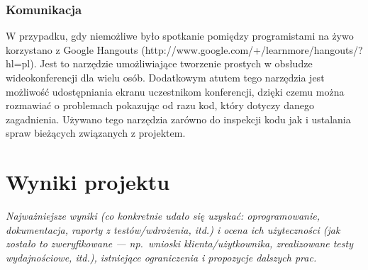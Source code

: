 \documentclass[polish,12pt]{aghthesis}
\begin{document}
\subsubsection{Komunikacja}

W przypadku, gdy niemożliwe było spotkanie pomiędzy programistami na żywo korzystano z Google Hangouts (http://www.google.com/+/learnmore/hangouts/?hl=pl). Jest to narzędzie umożliwiające tworzenie prostych w obsłudze wideokonferencji dla wielu osób. Dodatkowym atutem tego narzędzia jest możliwość udostępniania ekranu uczestnikom konferencji, dzięki czemu można rozmawiać o problemach pokazując od razu kod, który dotyczy danego zagadnienia. Używano tego narzędzia zarówno do inspekcji kodu jak i ustalania spraw bieżących związanych z projektem. 



\section{Wyniki projektu}

\label{sec:wyniki-projektu}

\emph{Najważniejsze wyniki (co konkretnie udało się uzyskać:
  oprogramowanie, dokumentacja, raporty z testów/wdrożenia, itd.)
  i ocena ich użyteczności (jak zostało to zweryfikowane --- np.\ wnioski
  klienta/użytkownika, zrealizowane testy wydajnościowe, itd.),
  istniejące ograniczenia i propozycje dalszych prac.}


\nocite{artykul2011,ksiazka2011,narzedzie2011,projekt2011}


\end{document}
